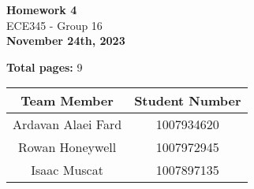 \begin{titlepage}
    \begin{center}
    {\fontsize{40}{48}\selectfont \bfseries Homework 4} 
    \\\vspace{20pt}
    {\LARGE ECE345 - Group 16} \\
    \vspace{20pt}
    \textbf{November 24th, 2023}
    \vspace{8pt}

    \textbf{Total pages:} 9
    \end{center}

    \begin{table}[!ht]
        \centering
        \begin{tabular}{|c|c|}
        \hline
            \textbf{Team Member} & \textbf{Student Number} \\ \hline
            Ardavan Alaei Fard & 1007934620 \\ \hline
            Rowan Honeywell & 1007972945 \\ \hline
            Isaac Muscat & 1007897135 \\ \hline
        \end{tabular}
    \end{table}
\end{titlepage}